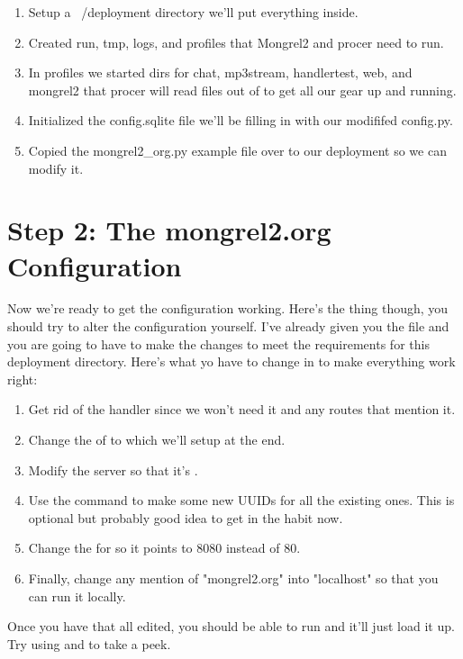 \begin{enumerate}
\item Setup a ~/deployment directory we'll put everything inside.
\item Created run, tmp, logs, and profiles that Mongrel2 and procer need to run.
\item In profiles we started dirs for chat, mp3stream, handlertest, web, and mongrel2
    that procer will read files out of to get all our gear up and running.
\item Initialized the config.sqlite file we'll be filling in with our modififed config.py.
\item Copied the mongrel2\_org.py example file over to our deployment so we can modify it.
\end{enumerate}


\section{Step 2: The mongrel2.org Configuration}

Now we're ready to get the configuration working.  Here's the thing though, you should 
try to alter the configuration yourself.  I've already given you the file and you are
going to have to make the changes to meet the requirements for this deployment directory.
Here's what yo have to change in  to make everything work right:

\begin{enumerate}
\item Get rid of the  handler since we won't need it and
    any routes that mention it.
\item Change the  of  to  which we'll setup at the end.
\item Modify the server  so that it's .
\item Use the  command to make some new UUIDs for all the 
    existing ones.  This is optional but probably good idea to get in the 
    habit now.
\item Change the  for  so it points to 8080 instead of 80.
\item Finally, change any mention of "mongrel2.org" into "localhost" so that you
    can run it locally.
\end{enumerate}

Once you have that all edited, you should be able to run  and it'll just load it up.  Try using
 and  to take a peek.


